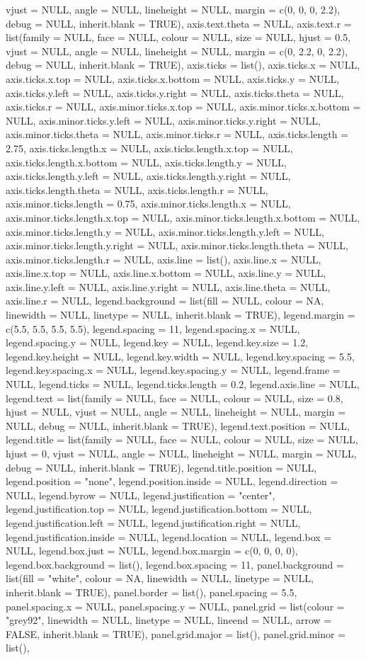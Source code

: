 \documentclass[
]{article}
\begin{document}
vjust = NULL, angle = NULL, lineheight = NULL, margin = c(0, 0, 0, 2.2), debug = NULL, inherit.blank = TRUE), axis.text.theta = NULL, axis.text.r = list(family = NULL, face = NULL, colour = NULL, size = NULL, hjust = 0.5, vjust = NULL, angle = NULL, lineheight = NULL, margin = c(0, 2.2, 0, 2.2), debug = NULL, inherit.blank = TRUE), axis.ticks = list(), axis.ticks.x = NULL, axis.ticks.x.top = NULL, axis.ticks.x.bottom = NULL, axis.ticks.y = NULL, axis.ticks.y.left = NULL, axis.ticks.y.right = NULL, axis.ticks.theta = NULL, axis.ticks.r = NULL, axis.minor.ticks.x.top = NULL, axis.minor.ticks.x.bottom = NULL, axis.minor.ticks.y.left = NULL, axis.minor.ticks.y.right = NULL, axis.minor.ticks.theta = NULL, axis.minor.ticks.r = NULL, axis.ticks.length = 2.75, axis.ticks.length.x = NULL, axis.ticks.length.x.top = NULL, axis.ticks.length.x.bottom = NULL, axis.ticks.length.y = NULL, axis.ticks.length.y.left = NULL, axis.ticks.length.y.right = NULL, axis.ticks.length.theta = NULL, axis.ticks.length.r = NULL, axis.minor.ticks.length = 0.75, axis.minor.ticks.length.x = NULL, axis.minor.ticks.length.x.top = NULL, axis.minor.ticks.length.x.bottom = NULL, axis.minor.ticks.length.y = NULL, axis.minor.ticks.length.y.left = NULL, axis.minor.ticks.length.y.right = NULL, axis.minor.ticks.length.theta = NULL, axis.minor.ticks.length.r = NULL, axis.line = list(), axis.line.x = NULL, axis.line.x.top = NULL, axis.line.x.bottom = NULL, axis.line.y = NULL, axis.line.y.left = NULL, axis.line.y.right = NULL, axis.line.theta = NULL, axis.line.r = NULL, legend.background = list(fill = NULL, colour = NA, linewidth = NULL, linetype = NULL, inherit.blank = TRUE), legend.margin = c(5.5, 5.5, 5.5, 5.5), legend.spacing = 11, legend.spacing.x = NULL, legend.spacing.y = NULL, legend.key = NULL, legend.key.size = 1.2, legend.key.height = NULL, legend.key.width = NULL, legend.key.spacing = 5.5, legend.key.spacing.x = NULL, legend.key.spacing.y = NULL, legend.frame = NULL, legend.ticks = NULL, legend.ticks.length = 0.2, legend.axis.line = NULL, legend.text = list(family = NULL, face = NULL, colour = NULL, size = 0.8, hjust = NULL, vjust = NULL, angle = NULL, lineheight = NULL, margin = NULL, debug = NULL, inherit.blank = TRUE), legend.text.position = NULL, legend.title = list(family = NULL, face = NULL, colour = NULL, size = NULL, hjust = 0, vjust = NULL, angle = NULL, lineheight = NULL, margin = NULL, debug = NULL, inherit.blank = TRUE), legend.title.position = NULL, legend.position = "none", legend.position.inside = NULL, legend.direction = NULL, legend.byrow = NULL, legend.justification = "center", legend.justification.top = NULL, legend.justification.bottom = NULL, legend.justification.left = NULL, legend.justification.right = NULL, legend.justification.inside = NULL, legend.location = NULL, legend.box = NULL, legend.box.just = NULL, legend.box.margin = c(0, 0, 0, 0), legend.box.background = list(), legend.box.spacing = 11, panel.background = list(fill = "white", colour = NA, linewidth = NULL, linetype = NULL, inherit.blank = TRUE), panel.border = list(), panel.spacing = 5.5, panel.spacing.x = NULL, panel.spacing.y = NULL, panel.grid = list(colour = "grey92", linewidth = NULL, linetype = NULL, lineend = NULL, arrow = FALSE, inherit.blank = TRUE), panel.grid.major = list(), panel.grid.minor = list(), 
\end{document}
